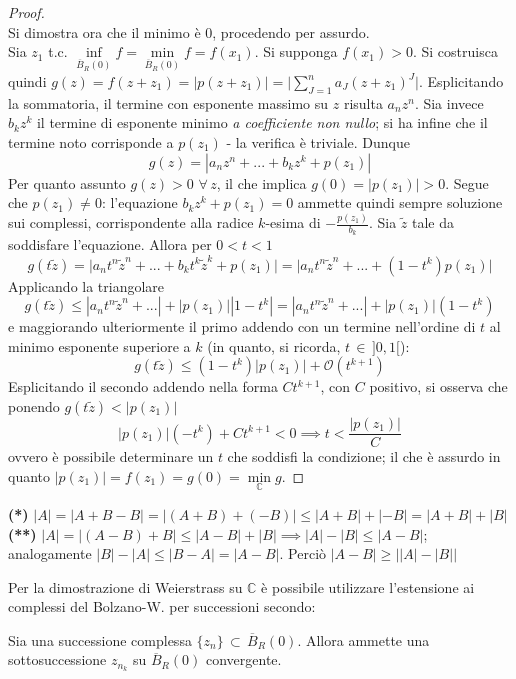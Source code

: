 \documentclass[10pt, oneside]{book}
\theoremstyle{plain}
\begin{document}
\begin{proof}
\\Si dimostra ora che il minimo è $0$, procedendo per assurdo. 
\\Sia $z_1$ t.c. $\displaystyle \inf\limits_{\overline{B}_R(0)} f = \min\limits_{\overline{B}_R(0)} f = f(x_1)$. Si supponga $f(x_1) > 0$. Si costruisca quindi $\displaystyle g(z) = f(z+z_1) = |p(z+z_1)| = \bigg|\sum\limits_{J=1}^n a_J (z+z_1)^J\bigg|$. Esplicitando la sommatoria, il termine con esponente massimo su $z$ risulta $a_n z^n$. Sia invece $b_k z^k$ il termine di esponente minimo \textit{a coefficiente non nullo}; si ha infine che il termine noto corrisponde a $p(z_1)$ - la verifica è triviale. Dunque
\[g(z) = |a_n z^n + ... + b_k z^k + p(z_1)|\]
Per quanto assunto $g(z) > 0$ $\forall \, z$, il che implica $g(0) = |p(z_1)| > 0$. Segue che $p(z_1) \neq 0$: l'equazione $b_k z^k + p(z_1) = 0$ ammette quindi sempre soluzione sui complessi, corrispondente alla radice $k$-esima di $\displaystyle -\frac{p(z_1)}{b_k}$. Sia $\tilde{z}$ tale da soddisfare l'equazione. Allora per $0 < t < 1$
\[g(t \tilde{z}) = \big| a_n t^n \tilde{z}^n + ... + b_k t^k \tilde{z}^k + p(z_1)\big| = \big| a_n t^n \tilde{z}^n + ... + (1-t^k) p(z_1) \big|\]
Applicando la triangolare
\[g(t \tilde{z}) \leq |a_n t^n \tilde{z}^n + ... | + |p(z_1)| |1-t^k| = |a_n t^n \tilde{z}^n + ... | + |p(z_1)| (1-t^k)\]
e maggiorando ulteriormente il primo addendo con un termine nell'ordine di $t$ al minimo esponente superiore a $k$ (in quanto, si ricorda, $t \, \in \, ]0,1[$):
\[g(t \tilde{z}) \leq (1-t^k) |p(z_1)| + \mathcal{O}(t^{k+1})\]
Esplicitando il secondo addendo nella forma $C t^{k+1}$, con $C$ positivo, si osserva che ponendo $g(t \tilde{z}) < |p(z_1)|$ 
\[|p(z_1)| (-t^k) + C t^{k+1} < 0 \implies t < \frac{|p(z_1)|}{C}\]
ovvero è possibile determinare un $t$ che soddisfi la condizione; il che è assurdo in quanto $\displaystyle |p(z_1)| = f(z_1) = g(0) = \min\limits_{\mathbb{C}} g$.
\end{proof}
\textbf{(*)} $|A| = |A + B - B| = |(A+B) + (-B)| \leq |A+B| + |-B| = |A+B| + |B|$
\\\textbf{(**)} $|A| = |(A-B) + B| \leq |A-B| + |B| \implies |A| - |B| \leq |A-B|$; analogamente $|B| - |A| \leq |B-A| = |A-B|$. Perciò $|A-B| \geq \big| |A| - |B| \big|$

Per la dimostrazione di Weierstrass su $\mathbb{C}$ è possibile utilizzare l'estensione ai complessi del Bolzano-W. per successioni secondo:
\begin{lem}
Sia una successione complessa $\{z_n\} \, \subset \, \overline{B}_R(0)$. Allora ammette una sottosuccessione $z_{n_k}$ su $\overline{B}_R(0)$ convergente.
\end{lem}
\end{document}
